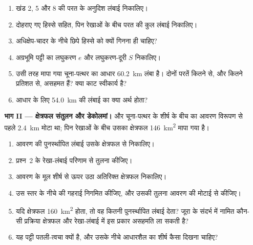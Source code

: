 \begin{problem}[{सप्ताहांत समस्या --- काट का पुनर्स्थापन}]
\begin{enumerate}
\item खंड 2, 5 और 8 की परत के अनुदिश लंबाई निकालिए।
\item दोहराए गए हिस्से सहित, पिन रेखाओं के बीच परत की कुल लंबाई
निकालिए।
\item अधिक्षेप-चादर के नीचे छिपे हिस्से को क्यों गिनना ही चाहिए?
\item अग्रभूमि पट्टी का लघुकरण $e$ और लघुकरण-दूरी $S$ निकालिए।
\item उसी तरह मापा गया चूना-पत्थर का आधार \qty{60.2}{km} लंबा है। दोनों परतें कितने से,
और कितने प्रतिशत से, असहमत हैं? क्या काट स्वीकार्य है?
\item आधार के लिए \qty{54.0}{km} की लंबाई का क्या अर्थ होता?
\end{enumerate}

\noindent\textbf{भाग II --- क्षेत्रफल संतुलन और डेकोलमां।}  और
चूना-पत्थर के शीर्ष के बीच का आवरण विरूपण से पहले \qty{2.4}{km} मोटा था; पिन रेखाओं के बीच उसका
क्षेत्रफल \qty{146}{km^2} मापा गया है।
\begin{enumerate}[resume]
\item आवरण की पुनर्स्थापित लंबाई उसके क्षेत्रफल से निकालिए।
\item प्रश्न~2 के रेखा-लंबाई परिणाम से तुलना कीजिए।
\item आवरण के मूल शीर्ष से ऊपर उठा अतिरिक्त क्षेत्रफल निकालिए।
\item उस स्तर के नीचे  की गहराई निगमित कीजिए, और उसकी तुलना आवरण की
मोटाई से कीजिए।
\item यदि क्षेत्रफल \qty{160}{km^2} होता, तो वह कितनी पुनर्स्थापित लंबाई देता? जूरा के संदर्भ में
नामित कौन-सी प्रक्रिया क्षेत्रफल और रेखा-लंबाई में इस प्रकार असहमति ला सकती है?
\item यह पट्टी पतली-त्वचा क्यों है, और उसके नीचे आधारशैल का शीर्ष
कैसा दिखना चाहिए?
\end{enumerate}


\end{problem}
